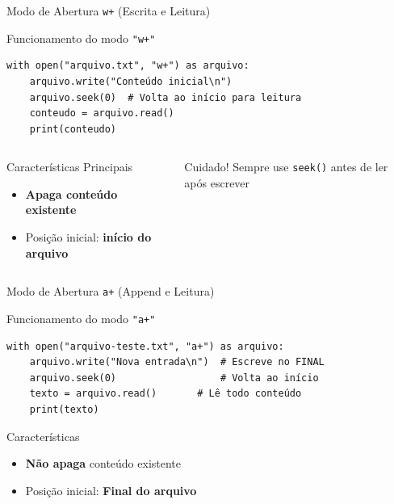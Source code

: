 \begin{frame}[fragile]{Modo de Abertura \texttt{w+} (Escrita e Leitura)}
    \begin{block}{Funcionamento do modo \texttt{"w+"}}
        \begin{verbatim}
with open("arquivo.txt", "w+") as arquivo:
    arquivo.write("Conteúdo inicial\n")
    arquivo.seek(0)  # Volta ao início para leitura
    conteudo = arquivo.read()
    print(conteudo)
        \end{verbatim}
    \end{block}

    \begin{columns}[T]
        \begin{column}{0.5\textwidth}
            \begin{alertblock}{Características Principais}
                \begin{itemize}
                    \item \textbf{Apaga conteúdo existente}

                    \item Posição inicial: \textbf{início do arquivo}

                \end{itemize}
            \end{alertblock}
        \end{column}

        \begin{column}{0.5\textwidth}


            \begin{block}{Cuidado!}
                Sempre use \texttt{seek()} antes de ler após escrever
            \end{block}
        \end{column}
    \end{columns}


\end{frame}
\begin{frame}[fragile]{Modo de Abertura \texttt{a+} (Append e Leitura)}

    \begin{block}{Funcionamento do modo \texttt{"a+"}}
        \begin{verbatim}
with open("arquivo-teste.txt", "a+") as arquivo:
    arquivo.write("Nova entrada\n")  # Escreve no FINAL
    arquivo.seek(0)                  # Volta ao início
    texto = arquivo.read()       # Lê todo conteúdo
    print(texto)
\end{verbatim}
    \end{block}

    \begin{alertblock}{Características}
        \begin{itemize}
            \item \textbf{Não apaga} conteúdo existente
            \item Posição inicial:  \textbf{Final do arquivo}

        \end{itemize}
    \end{alertblock}
\end{frame}




